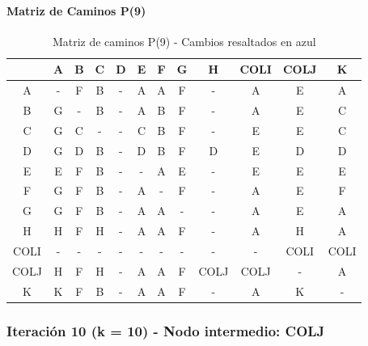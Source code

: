 \documentclass[12pt]{article}
\begin{document}
\paragraph{Matriz de Caminos P(9)}
\begin{table}[h!]
\centering
\begin{tabular}{|c|c|c|c|c|c|c|c|c|c|c|c|}
\hline
 & A & B & C & D & E & F & G & H & COLI & COLJ & K \\\hline
A & - & F & B & - & A & A & F & - & A & E & A \\\hline
B & G & - & B & - & A & B & F & - & A & E & C \\\hline
C & G & C & - & - & C & B & F & - & E & E & C \\\hline
D & G & D & B & - & D & B & F & D & E & D & D \\\hline
E & E & F & B & - & - & A & E & - & E & E & E \\\hline
F & G & F & B & - & A & - & F & - & A & E & F \\\hline
G & G & F & B & - & A & A & - & - & A & E & A \\\hline
H & H & F & H & - & A & A & F & - & A & H & A \\\hline
COLI & - & - & - & - & - & - & - & - & - & COLI & COLI \\\hline
COLJ & H & F & H & - & A & A & F & COLJ & COLJ & - & A \\\hline
K & K & F & B & - & A & A & F & - & A & K & - \\\hline
\end{tabular}
\caption{Matriz de caminos P(9) - Cambios resaltados en azul}
\end{table}

\subsubsection{Iteración 10 (k = 10) - Nodo intermedio: COLJ}
\end{document}
